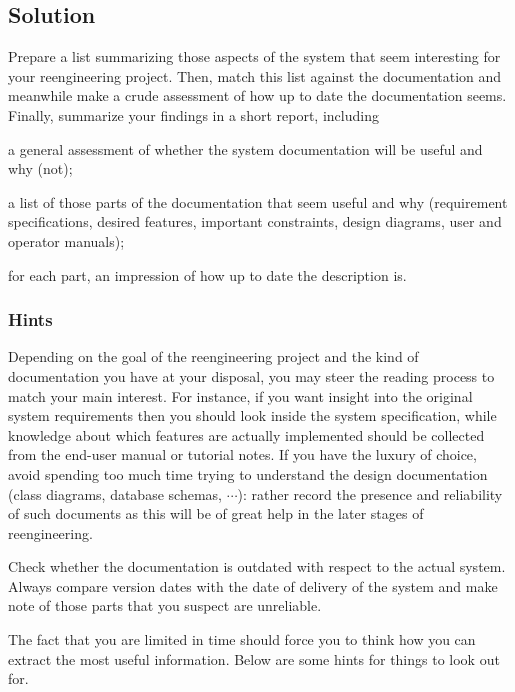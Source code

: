 \documentclass[a4paper,10pt,twoside]{book}
\begin{document}
\subsection*{Solution}

Prepare a list summarizing those aspects of the system that seem interesting for your reengineering project. Then, match this list against the documentation and meanwhile make a crude assessment of how up to date the documentation seems. Finally, summarize your findings in a short report, including

\begin{bulletlist}
  \item a general assessment of whether the system documentation will be useful and why (not);

  \item a list of those parts of the documentation that seem useful and why (\eg requirement specifications, desired features, important constraints, design diagrams, user and operator manuals);

  \item for each part, an impression of how up to date the description is.
\end{bulletlist}

\subsubsection*{Hints}

Depending on the goal of the reengineering project and the kind of documentation you have at your disposal, you may steer the reading process to match your main interest. For instance, if you want insight into the original system requirements then you should look inside the system specification, while knowledge about which features are actually implemented should be collected from the end-user manual or tutorial notes. If you have the luxury of choice, avoid spending too much time trying to understand the design documentation (\ie class diagrams, database schemas, $\cdots$): rather record the presence and reliability of such documents as this will be of great help in the later stages of reengineering. 

Check whether the documentation is outdated with respect to the actual system. Always compare version dates with the date of delivery of the system and make note of those parts that you suspect are unreliable. 

The fact that you are limited in time should force you to think how you can extract the most useful information. Below are some hints for things to look out for.
\end{document}
